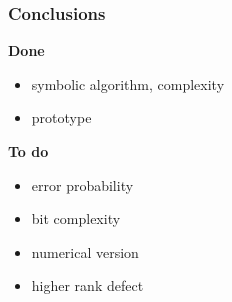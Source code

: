 \documentclass[mathserif,11pt]{beamer}
\def\rk#1{\cdef{{\bf \small #1}}}
\def\cdef#1{\textcolor{_cdef}{#1}}
\begin{document}
\begin{frame}

\frametitle{Conclusions}

\rk{Done}
\begin{itemize}
\item symbolic algorithm, complexity
\item prototype
\end{itemize}

\medskip

\rk{To do}
\begin{itemize}
\item error probability 
\item bit complexity
\item numerical version
\item higher rank defect
\end{itemize}

\end{frame}
\end{document}
